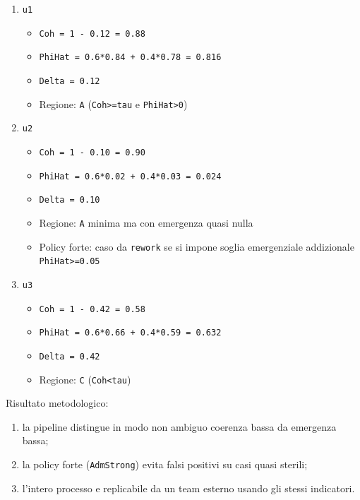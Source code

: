\begin{enumerate}
\def\labelenumi{\arabic{enumi}.}
\item
  \texttt{u1}

  \begin{itemize}
  \tightlist
  \item
    \texttt{Coh\ =\ 1\ -\ 0.12\ =\ 0.88}
  \item
    \texttt{PhiHat\ =\ 0.6*0.84\ +\ 0.4*0.78\ =\ 0.816}
  \item
    \texttt{Delta\ =\ 0.12}
  \item
    Regione: \texttt{A} (\texttt{Coh\textgreater{}=tau} e \texttt{PhiHat\textgreater{}0})
  \end{itemize}
\item
  \texttt{u2}

  \begin{itemize}
  \tightlist
  \item
    \texttt{Coh\ =\ 1\ -\ 0.10\ =\ 0.90}
  \item
    \texttt{PhiHat\ =\ 0.6*0.02\ +\ 0.4*0.03\ =\ 0.024}
  \item
    \texttt{Delta\ =\ 0.10}
  \item
    Regione: \texttt{A} minima ma con emergenza quasi nulla
  \item
    Policy forte: caso da \texttt{rework} se si impone soglia emergenziale addizionale \texttt{PhiHat\textgreater{}=0.05}
  \end{itemize}
\item
  \texttt{u3}

  \begin{itemize}
  \tightlist
  \item
    \texttt{Coh\ =\ 1\ -\ 0.42\ =\ 0.58}
  \item
    \texttt{PhiHat\ =\ 0.6*0.66\ +\ 0.4*0.59\ =\ 0.632}
  \item
    \texttt{Delta\ =\ 0.42}
  \item
    Regione: \texttt{C} (\texttt{Coh\textless{}tau})
  \end{itemize}
\end{enumerate}

Risultato metodologico:

\begin{enumerate}
\def\labelenumi{\arabic{enumi}.}
\tightlist
\item
  la pipeline distingue in modo non ambiguo coerenza bassa da emergenza bassa;
\item
  la policy forte (\texttt{AdmStrong}) evita falsi positivi su casi quasi sterili;
\item
  l'intero processo e replicabile da un team esterno usando gli stessi indicatori.
\end{enumerate}

